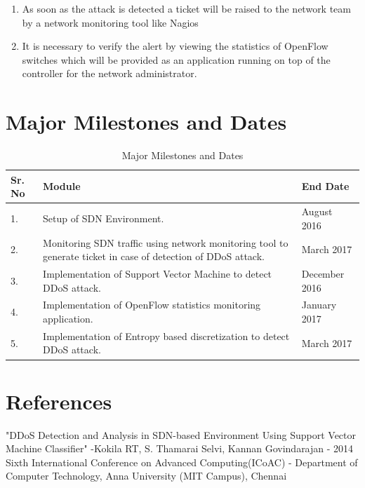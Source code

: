 \documentclass[12pt,a4paper,final]{article}
\begin{document}
\begin{flushleft}
\begin{enumerate}
\item
As soon
as the attack is detected a ticket will be raised to the network team by a network monitoring tool like Nagios

\item
It is necessary to verify the alert by viewing the statistics of OpenFlow switches which will be provided as an application running on top of the controller for the
network administrator.
\end{enumerate}

\newpage
\noindent
\section{Major Milestones and Dates}
\begin{table}[H]
\begin{tabular}{ | m{1cm} | m{9cm}| m{3cm} | } 
\hline
\textbf{Sr. No} & \textbf{Module} & \textbf{End Date} \\
\hline
1. & 
Setup of SDN Environment. & 
August 2016 \\ 
\hline

2. &
Monitoring SDN traffic using network monitoring tool to generate ticket in case of detection of DDoS attack. &
March 2017 \\ 
\hline

3. & 
Implementation of Support Vector Machine to detect DDoS attack. &
December 2016 \\
\hline

4. & 
Implementation of OpenFlow statistics monitoring application. &
January 2017 \\
\hline

5. & 
Implementation of Entropy based discretization to detect DDoS attack. &
March 2017 \\
\hline
\end{tabular}
\caption{Major Milestones and Dates}
\end{table}

\noindent
\section{References}
\begin{enumerate}[label={[\arabic*]}]
\item 
"DDoS Detection and Analysis in SDN-based Environment Using Support Vector Machine Classifier" -Kokila RT, S. Thamarai Selvi, Kannan Govindarajan - 2014 Sixth International Conference on Advanced Computing(ICoAC) - Department of Computer Technology, Anna University (MIT Campus), Chennai


\end{enumerate}
\end{flushleft}
\end{document}
